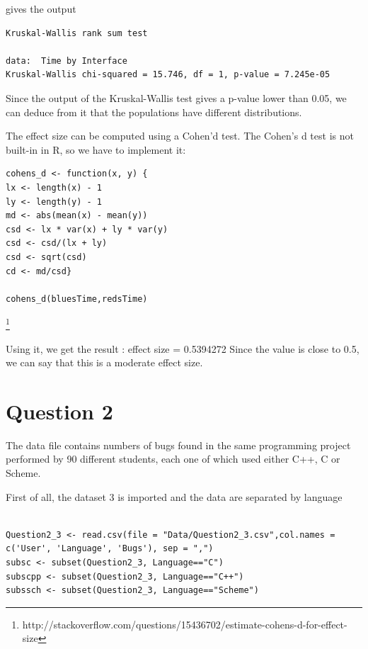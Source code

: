 \documentclass[12pt,a4paper]{scrartcl}
\begin{document}
gives the output
\begin{lstlisting}[frame=single, language=bash]
    Kruskal-Wallis rank sum test

data:  Time by Interface
Kruskal-Wallis chi-squared = 15.746, df = 1, p-value = 7.245e-05
\end{lstlisting}
Since the output of the Kruskal-Wallis test gives a p-value lower than 0.05, we can deduce from it that the populations have different distributions.

The effect size can be computed using a Cohen'd test.
The Cohen's d test is not built-in in R, so we have to implement it:
\begin{lstlisting}[frame=single]
cohens_d <- function(x, y) {
lx <- length(x) - 1
ly <- length(y) - 1
md <- abs(mean(x) - mean(y))
csd <- lx * var(x) + ly * var(y)
csd <- csd/(lx + ly)
csd <- sqrt(csd)
cd <- md/csd}

cohens_d(bluesTime,redsTime)
\end{lstlisting}\footnote{http://stackoverflow.com/questions/15436702/estimate-cohens-d-for-effect-size}

Using it, we get the result : effect size = 0.5394272
Since the value is close to 0.5, we can say that this is a moderate effect size.




\section{Question 2}
The data file contains numbers of bugs found in the same programming project performed by 90 different students, each one of which used either C++, C or Scheme.

First of all, the dataset 3 is imported and the data are separated by language 
\begin{lstlisting}[frame=single]

Question2_3 <- read.csv(file = "Data/Question2_3.csv",col.names = c('User', 'Language', 'Bugs'), sep = ",")
subsc <- subset(Question2_3, Language=="C")
subscpp <- subset(Question2_3, Language=="C++")
subssch <- subset(Question2_3, Language=="Scheme")
\end{lstlisting}
\end{document}
